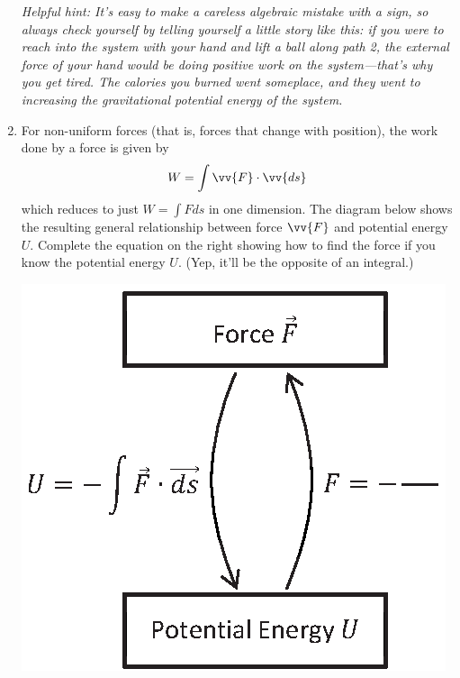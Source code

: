 \begin{enumerate}[wide, label=(\emph{\alph*})]
\textit{Helpful hint: It's easy to make a careless algebraic mistake with a sign, so always check yourself by telling yourself a little story like this: if you were to reach into the system with your hand and lift a ball along path 2, the external force of your hand would be doing \textit{positive} work on the system---that's why you get tired.  The calories you burned went someplace, and they went to \textit{increasing} the gravitational potential energy of the system. }

\pagebreak[3]

\item For non-uniform forces (that is, forces that change with position), the work done by a force is given by 
$$W=\int{\vv{F} \cdot \vv{ds}}$$
which reduces to just $W=\int{F ds}$ in one dimension.  The diagram below shows the resulting general relationship between force $\vv{F}$ and potential energy $U$.  Complete the equation on the right showing how to find the force if you know the potential energy $U$.  (Yep, it'll be the opposite of an integral.)
\begin{center}
\vspace{-0.1in}
\includegraphics{potential_intro/concept_map_figs/concept_map_F_and_U_blank_squish.eps}
\end{center}



\end{enumerate}
